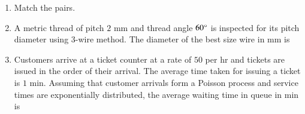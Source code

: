 \documentclass[journal]{IEEEtran}
\begin{document}
\begin{enumerate}[leftmargin=0pt]
\hfill{}

\item Match the  pairs.

\begin{table}[h]
    \centering
    
\end{table}
\begin{enumerate}
\end{enumerate}

\hfill{}

\item A metric thread of pitch $2$ mm and thread angle $60\degree$ is inspected for its pitch diameter using 3-wire method. The diameter of the best size wire in mm is 
\begin{enumerate}
\end{enumerate}
\hfill{}

\item Customers arrive at a ticket counter at a rate of $50$ per hr and tickets are issued in the order of their arrival. The average time taken for issuing a ticket is $1$ min. Assuming that customer arrivals form a Poisson process and service times are exponentially distributed, the average waiting time in queue in min is 
\begin{enumerate}
\end{enumerate}
\hfill{}


\end{enumerate}
\end{document}
